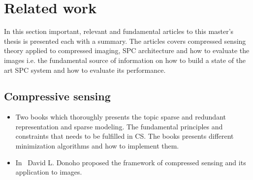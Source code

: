 \section{Related work}
In this section important, relevant and fundamental articles to this master's thesis is presented each with a summary. The articles covers compressed sensing theory applied to compressed imaging, SPC architecture and how to evaluate the images i.e. the fundamental source of information on how to build a state of the art SPC system and how to evaluate its performance. 

\subsection{Compressive sensing}
\begin{itemize}


\item \cite{book:sm, book:srr} Two books which thoroughly presents the topic sparse and redundant representation and sparse modeling. The fundamental principles and constraints that needs to be fulfilled in CS. The books presents different minimization algorithms and how to implement them.   

\item In~\cite{article:CS_donoho1} David L. Donoho proposed the framework of compressed sensing and its application to images.

\end{itemize}

